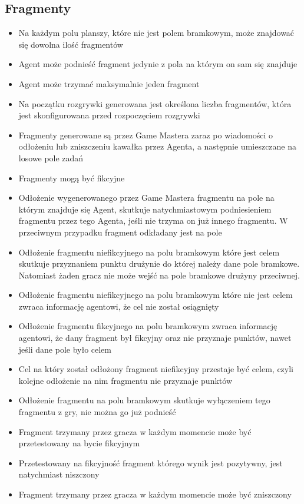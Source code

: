 \documentclass[Dokumentacja.tex]{subfiles}
\begin{document}
\subsection{Fragmenty}
\begin{itemize}
    \item Na każdym polu planszy, które nie jest polem bramkowym, może znajdować się dowolna ilość fragmentów
	\item Agent może podnieść fragment jedynie z pola na którym on sam się znajduje
    \item Agent może trzymać maksymalnie jeden fragment
    \item Na początku rozgrywki generowana jest określona liczba fragmentów, która jest skonfigurowana przed rozpoczęciem rozgrywki
    \item Fragmenty generowane są przez Game Mastera zaraz po wiadomości o odłożeniu lub zniszczeniu kawałka przez Agenta, a następnie umieszczane na losowe pole zadań
	\item Fragmenty mogą być fikcyjne
    \item Odłożenie wygenerowanego przez Game Mastera fragmentu na pole na którym znajduje się Agent, skutkuje natychmiastowym podniesieniem fragmentu przez tego Agenta, jeśli nie trzyma on już innego fragmentu. W przeciwnym przypadku fragment odkładany jest na pole
    \item Odłożenie fragmentu niefikcyjnego na polu bramkowym które jest celem skutkuje przyznaniem punktu drużynie do której należy dane pole bramkowe. Natomiast żaden gracz nie może wejść na pole bramkowe drużyny przeciwnej.
    \item Odłożenie fragmentu niefikcyjnego na polu bramkowym które nie jest celem zwraca informację agentowi, że cel nie został osiągnięty
	\item Odłożenie fragmentu fikcyjnego na polu bramkowym zwraca informację agentowi, że dany fragment był fikcyjny oraz nie przyznaje punktów, nawet jeśli dane pole było celem
    \item Cel na który został odłożony fragment niefikcyjny przestaje być celem, czyli kolejne odłożenie na nim fragmentu nie przyznaje punktów
    \item Odłożenie fragmentu na polu bramkowym skutkuje wyłączeniem tego fragmentu z gry, nie można go już podnieść
    \item Fragment trzymany przez gracza w każdym momencie może być przetestowany na bycie fikcyjnym
    \item Przetestowany na fikcyjność fragment którego wynik jest pozytywny, jest natychmiast niszczony
    \item Fragment trzymany przez gracza w każdym momencie może być zniszczony
\end{itemize}
\end{document}
